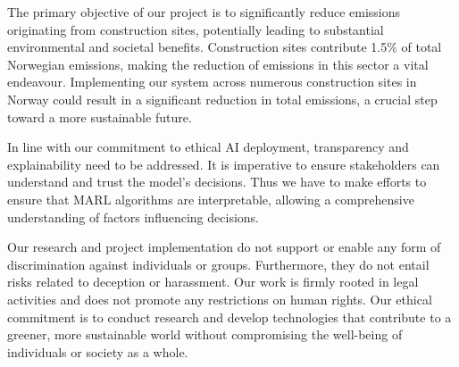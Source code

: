 \documentclass[conference]{IEEEtran}
\begin{document}

The primary objective of our project is to significantly reduce \coo{} emissions originating from
construction sites, potentially leading to substantial environmental and societal benefits.
Construction sites contribute 1.5\% of total Norwegian \coo{} emissions, making the reduction of
emissions in this sector a vital endeavour. Implementing our system across numerous construction sites
in Norway could result in a significant reduction in total \coo{} emissions, a crucial step toward a more
sustainable future.

In line with our commitment to ethical AI deployment, transparency and explainability need to be
addressed. It is imperative to ensure stakeholders can understand and trust the model's decisions.
Thus we have to make efforts to ensure that MARL algorithms are interpretable, allowing a comprehensive
understanding of factors influencing decisions.

Our research and project implementation do not support or enable any form of discrimination against
individuals or groups. Furthermore, they do not entail risks related to deception or harassment.
Our work is firmly rooted in legal activities and does not promote any restrictions on human rights.
Our ethical commitment is to conduct research and develop technologies that contribute to a greener,
more sustainable world without compromising the well-being of individuals or society as a whole.

\newpage


\nocite{*}        %


\end{document}
